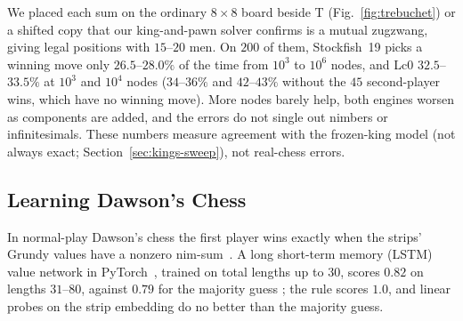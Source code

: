 We placed each sum on the ordinary $8\times8$ board beside T (Fig.~\ref{fig:trebuchet}) or a shifted copy that our
king-and-pawn solver confirms is a mutual zugzwang, giving legal positions with $15$--$20$ men. On $200$ of
them, Stockfish~19 picks a winning move only $26.5$--$28.0\%$ of the time from $10^3$ to $10^6$ nodes, and Lc0
$32.5$--$33.5\%$ at $10^3$ and $10^4$ nodes  ($34$--$36\%$ and $42$--$43\%$ without the $45$
second-player wins, which have no winning move). More nodes barely help, both engines worsen as components are
added, and the errors do not single out nimbers or infinitesimals. These numbers measure agreement with the
frozen-king model (not always exact; Section~\ref{sec:kings-sweep}), not real-chess errors.

\subsection{Learning Dawson's Chess}

In normal-play Dawson's chess the first player wins exactly when the strips' Grundy values have a nonzero
nim-sum~\cite{GuySmith1956,WinningWays}. A long short-term memory (LSTM) value network in PyTorch~\cite{PyTorch}, trained on total lengths up to
$30$, scores $0.82$ on lengths $31$--$80$, against $0.79$ for the majority guess ; the rule scores $1.0$,
and linear probes on the strip embedding do no better than the majority guess.
